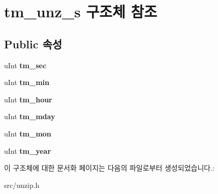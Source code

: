 \hypertarget{structtm__unz__s}{}\section{tm\+\_\+unz\+\_\+s 구조체 참조}
\label{structtm__unz__s}
\subsection*{Public 속성}
\begin{DoxyCompactItemize}
\item 
\mbox{\label{structtm__unz__s_ab91e69a9869e5db5be51b1aebaa5ea0d}} 
u\+Int {\bfseries tm\+\_\+sec}
\item 
\mbox{\label{structtm__unz__s_ac5a6bf08a4c5db8ae2243d4f0c35b192}} 
u\+Int {\bfseries tm\+\_\+min}
\item 
\mbox{\label{structtm__unz__s_ada09255f794d6c2db07ef73b77266b9c}} 
u\+Int {\bfseries tm\+\_\+hour}
\item 
\mbox{\label{structtm__unz__s_a51ed1873e1dcabf08ff0f85caf8aefee}} 
u\+Int {\bfseries tm\+\_\+mday}
\item 
\mbox{\label{structtm__unz__s_a4f5e461d8cad18d1aff7ec012168111d}} 
u\+Int {\bfseries tm\+\_\+mon}
\item 
\mbox{\label{structtm__unz__s_a5f17147e3cfbbfdbeb2e29cbc1df8136}} 
u\+Int {\bfseries tm\+\_\+year}
\end{DoxyCompactItemize}


이 구조체에 대한 문서화 페이지는 다음의 파일로부터 생성되었습니다.\+:\begin{DoxyCompactItemize}
\item 
src/unzip.\+h\end{DoxyCompactItemize}
